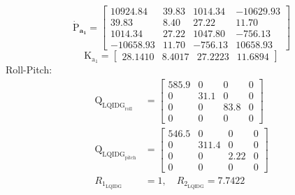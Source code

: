 \documentclass[conference]{IEEEtran}
\begin{document}
\begin{equation}
	\boldsymbol{\dot{\mathrm{P}}_{a_1}} = \begin{bmatrix}
		10924.84&   39.83 & 1014.34 & -10629.93\\
		39.83   &  8.40 & 27.22& 11.70\\
		1014.34 &  27.22 & 1047.80 & -756.13\\
		-10658.93 & 11.70 & -756.13 & 10658.93
	\end{bmatrix}
\end{equation}
\begin{equation}
	\boldsymbol{\mathrm{K_{a_1}}} = \begin{bmatrix}
		28.1410 &   8.4017  & 27.2223  & 11.6894
	\end{bmatrix}
\end{equation}
Roll-Pitch:
\begin{equation}
	\begin{split}
		\boldsymbol{\mathrm{Q}}_{{\text{LQIDG}_{\text{roll}}}} &= \begin{bmatrix}
			585.9 &0& 0& 0\\
			0 &  31.1 & 0 &0 \\
			0 & 0 & 83.8 & 0\\
			0 & 0 & 0 & 0
		\end{bmatrix}\\[1em]
	    \boldsymbol{\mathrm{Q}}_{{\text{LQIDG}_{\text{pitch}}}} &= \begin{bmatrix}
		546.5 &0& 0& 0\\
		0 &  311.4 & 0 &0 \\
		0 & 0 & 2.22 & 0\\
		0 & 0 & 0 & 0
		\end{bmatrix}\\[1em]
	 R_{1_{\text{LQIDG}}} &=  1, \quad R_{2_{\text{LQIDG}}} =  7.7422
	\end{split}
\end{equation}
\end{document}
